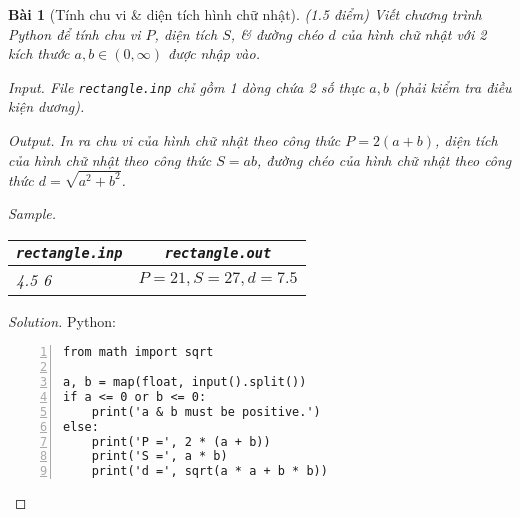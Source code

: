 \documentclass{article}
\newtheorem{baitoan}{Bài}
\begin{document}
\begin{baitoan}[Tính chu vi \& diện tích hình chữ nhật]
	{\rm(1.5 điểm)} Viết chương trình Python để tính chu vi $P$, diện tích $S$, \& đường chéo $d$ của hình chữ nhật với 2 kích thước $a,b\in(0,\infty)$ được nhập vào.
	\item {\sf Input.} File {\tt rectangle.inp} chỉ gồm 1 dòng chứa 2 số thực $a,b$ (phải kiểm tra điều kiện dương).
	\item {\sf Output.} In ra chu vi của hình chữ nhật theo công thức $P = 2(a + b)$, diện tích của hình chữ nhật theo công thức $S = ab$, đường chéo của hình chữ nhật theo công thức $d = \sqrt{a^2 + b^2}$.
	\item {\sf Sample.}
	\begin{table}[H]
		\centering
		\begin{tabular}{|l|c|}
			\hline
			\verb|rectangle.inp| & \verb|rectangle.out| \\
			\hline
			4.5 6 & $P = 21,S = 27,d = 7.5$ \\
			\hline
		\end{tabular}
	\end{table}
\end{baitoan}

\begin{proof}[Solution]
    Python:
    \begin{Verbatim}[numbers=left,xleftmargin=5mm]
from math import sqrt

a, b = map(float, input().split())
if a <= 0 or b <= 0:
	print('a & b must be positive.')
else:
	print('P =', 2 * (a + b))
	print('S =', a * b)
	print('d =', sqrt(a * a + b * b))
    \end{Verbatim}
\end{proof}
\end{document}
